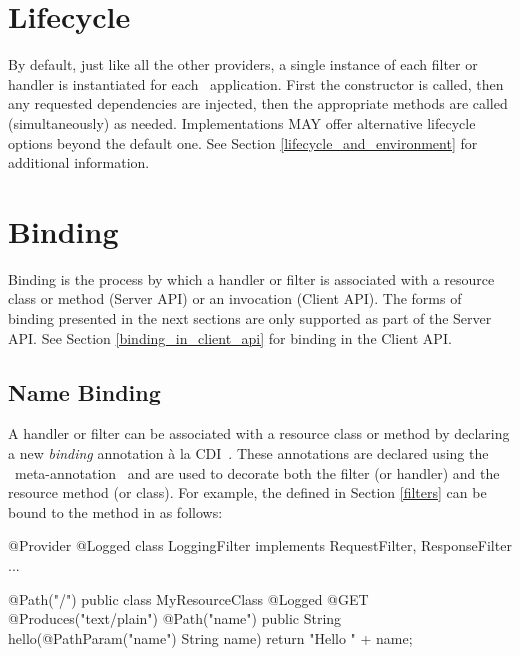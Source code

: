 \section{Lifecycle}

By default, just like all the other providers, a single instance of each filter or handler is instantiated for each \jaxrs\ application. First the constructor is called, then any requested dependencies are injected, then the appropriate methods are called (simultaneously) as needed. Implementations MAY offer alternative lifecycle options beyond the default one. See Section \ref{lifecycle_and_environment} for additional information.

\section{Binding}

Binding is the process by which a handler or filter is associated with a resource class or method (Server API) or an invocation (Client API). The forms of binding presented in the next sections are only supported as part of the Server API. See Section \ref{binding_in_client_api} for binding in the Client API.

\subsection{Name Binding}
\label{Name_Binding}

A handler or filter can be associated with a resource class or method by declaring a new \emph{binding} annotation \`{a} la CDI~\cite{jsr299}. These annotations are declared using the \jaxrs\ meta-annotation \NameBinding\ and are used to decorate both the filter (or handler) and the resource method (or class). For example, the  defined in Section \ref{filters} can be bound to the method  in  as follows:

\begin{listing}{1}
@Provider
@Logged
class LoggingFilter implements RequestFilter, ResponseFilter {
    ...
}
\end{listing}

\begin{listing}{1}
@Path("/")
public class MyResourceClass {
    @Logged
    @GET
    @Produces("text/plain")
    @Path("{name}")
    public String hello(@PathParam("name") String name) {
        return "Hello " + name;
    }
}
\end{listing}

